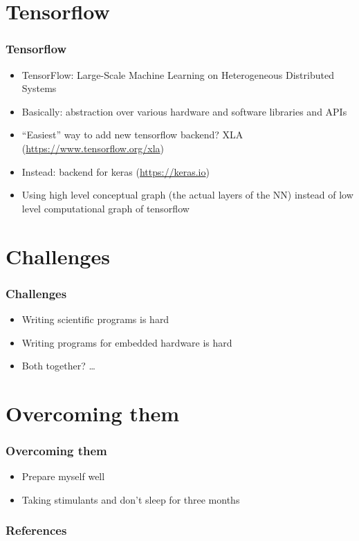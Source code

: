 \documentclass[xcolor=x11names,compress,usenames,dvipsnames,mathsans]{beamer}
\begin{document}
\section{Tensorflow}

\begin{frame}[fragile]
  \frametitle{Tensorflow}

  \begin{itemize}[<+->]
    \item TensorFlow: Large-Scale Machine Learning on
          Heterogeneous Distributed Systems \cite{tf_2015}
    \item Basically: abstraction over various hardware and
          software libraries and APIs
    \item ``Easiest'' way to add new tensorflow backend? XLA
          (\url{https://www.tensorflow.org/xla})
    \item Instead: backend for keras (\url{https://keras.io})
    \item Using high level conceptual graph (the actual
          layers of the NN) instead of low level
          computational graph of tensorflow
  \end{itemize}
\end{frame}

\section{Challenges}

\begin{frame}[fragile]
  \frametitle{Challenges}

  \begin{itemize}[<+->]
    \item Writing scientific programs is hard
    \item Writing programs for embedded hardware is hard
    \item Both together? \dots
  \end{itemize}
\end{frame}

\section{Overcoming them}

\begin{frame}[fragile]
  \frametitle{Overcoming them}

  \begin{itemize}[<+->]
    \item Prepare myself well
    \item Taking stimulants and don't sleep for three
          months
  \end{itemize}
\end{frame}

\begin{frame}
  \frametitle{References}
  
\end{frame}
\end{document}
